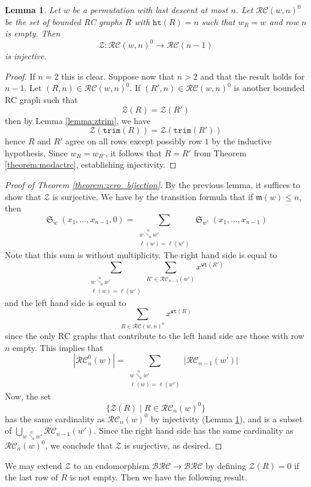 \documentclass[a4paper,fleqn]{cas-sc}
\newtheorem{lemma}{Lemma}[subsection]
\theoremstyle{definition}
\theoremstyle{remark}
\numberwithin{equation}{subsection}
\DeclareMathOperator{\sch}{\mathfrak{S}}
\newcommand{\downvar}[1]{\stackrel{#1}{\searrow}}
\newcommand{\wof}[1]{w_{#1}}
\newcommand{\wtt}{\mathtt{wt}}
\newcommand{\trm}{\mathtt{trim}}
\newcommand{\zeromap}{\mathcal{Z}}
\newcommand{\hr}{\mathtt{ht}}
\newcommand{\BRC}{\mathcal{BRC}}
\newcommand{\RC}{\mathcal{RC}}
\newcommand{\maxd}{\mathfrak{m}}
\begin{document}
\begin{lemma} \label{lemma:zero_injective}
Let $w$ be a permutation with last descent at most $n$. Let $\mathcal{RC}(w,n)^0$ be the set of bounded RC graphs $R$ with $\hr(R) = n$ such that $\wof{R}=w$ and row $n$ is empty. Then
$$\zeromap:\mathcal{RC}(w, n)^{0}\to \mathcal{RC}(n-1)$$
is injective.
\end{lemma}
\begin{proof}
If $n=2$ this is clear. Suppose now that $n > 2$ and that the result holds for $n-1$. Let $(R, n)\in \mathcal{RC}(w, n)^0$. If $(R', n)\in\mathcal{RC}(w,n)^0$ is another bounded RC graph such that
$$\zeromap(R) = \zeromap(R')$$
then by Lemma \ref{lemma:ztrim}, we have
$$\zeromap(\trm(R)) = \zeromap(\trm(R'))$$
hence $R$ and $R'$ agree on all rows except possibly row $1$ by the inductive hypothesis. Since $\wof{R} = \wof{R'}$, it follows that $R = R'$ from Theorem \ref{theorem:modactrc}, establishing injectivity.
\end{proof}

\begin{proof}[Proof of Theorem \ref{theorem:zero_bijection}]
By the previous lemma, it suffices to show that $\zeromap$ is surjective. We have by the transition formula that if $\maxd(w)\leq n$, then
$$\sch_w(x_1,\ldots,x_{n-1},0) = \sum_{\substack{w\downvar{n} w'\\\ell(w)=\ell(w')}}\sch_{w'}(x_1,\ldots,x_{n-1})$$
Note that this sum is without multiplicity. The right hand side is equal to
$$\sum_{\substack{w\downvar{n} w'\\\ell(w)=\ell(w')}}\sum_{R'\in \RC_{n-1}(w')}x^{\wtt(R')}$$
and the left hand side is equal to
$$\sum_{R\in \mathcal{RC}(w, n)^0}x^{\wtt(R)}$$
since the only RC graphs that contribute to the left hand side are those with row $n$ empty. This implies that
$$|\RC_n^0(w)| = \sum_{\substack{w\downvar{n} w'\\\ell(w)=\ell(w')}}|\RC_{n-1}(w')|$$
Now, the set 
$$\{\zeromap(R) \mid R\in \mathcal{RC}_n(w)^0\}$$
has the same cardinality as $\mathcal{RC}_n(w)^0$ by injectivity (Lemma \ref{lemma:zero_injective}), and is a subset of $\bigcup_{w\downvar{n} w'}\mathcal{RC}_{n-1}(w')$. Since the right hand side has the same cardinality as $\mathcal{RC}_n(w)^0$, we conclude that $\zeromap$ is surjective, as desired.
\end{proof}


We may extend $\zeromap$ to an endomorphism $\BRC\to\BRC$ by defining $\zeromap(R) = 0$ if the last row of $R$ is not empty. Then we have the following result.
\end{document}

